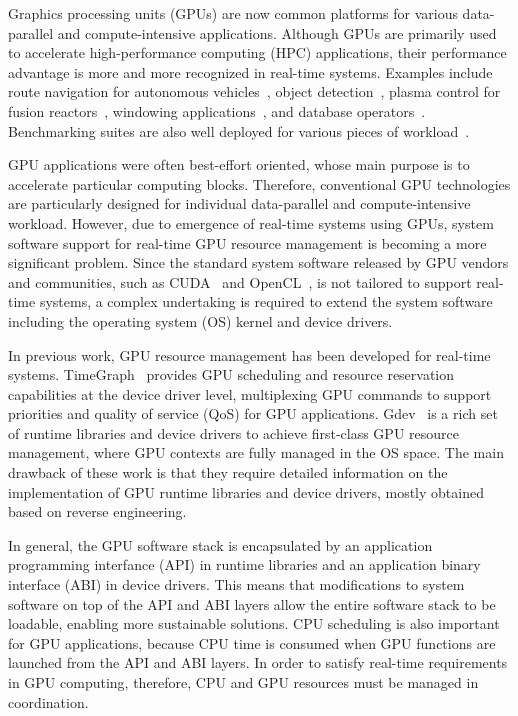 Graphics processing units (GPUs) are now common platforms for various
data-parallel and compute-intensive applications.
Although GPUs are primarily used to accelerate high-performance
computing (HPC) applications, their performance advantage is more and
more recognized in real-time systems.
Examples include route navigation for autonomous
vehicles~\cite{cmu:routing}, object
detection~\cite{hirabayashi:cpsna2013}, plasma control for fusion 
reactors~\cite{tokamak}, windowing applications~\cite{kato:rtas2011},
and database operators~\cite{bakkum:sql}.
Benchmarking suites are also well deployed for various pieces of
workload~\cite{rodinia}.

GPU applications were often best-effort oriented, whose main purpose is
to accelerate particular computing blocks.
Therefore, conventional GPU technologies are particularly designed for
individual data-parallel and compute-intensive workload.
However, due to emergence of real-time systems using GPUs, system
software support for real-time GPU resource management is becoming a
more significant problem.
Since the standard system software released by GPU vendors and
communities, such as CUDA~\cite{nvidia:cuda_zone} and
OpenCL~\cite{opencl}, is not tailored to support real-time systems, a
complex undertaking is required to extend the system software including
the operating system (OS) kernel and device drivers.

In previous work, GPU resource management has been developed for
real-time systems.
TimeGraph~\cite{kato:timegraph} provides GPU scheduling and resource
reservation capabilities at the device driver level, multiplexing GPU
commands to support priorities and quality of service (QoS) for GPU
applications.
Gdev~\cite{kato:gdev} is a rich set of runtime libraries and device
drivers to achieve first-class GPU resource management, where GPU
contexts are fully managed in the OS space.
The main drawback of these work is that they require detailed
information on the implementation of GPU runtime libraries 
and device drivers, mostly obtained based on reverse engineering.

In general, the GPU software stack is encapsulated by an application
programming interfance (API) in runtime libraries and an application
binary interface (ABI) in device drivers.
This means that modifications to system software on top of the API and
ABI layers allow the entire software stack to be loadable, enabling more
sustainable solutions.
CPU scheduling is also important for GPU applications, because CPU time
is consumed when GPU functions are launched from the API and ABI layers.
In order to satisfy real-time requirements in GPU computing, therefore,
CPU and GPU resources must be managed in coordination.

